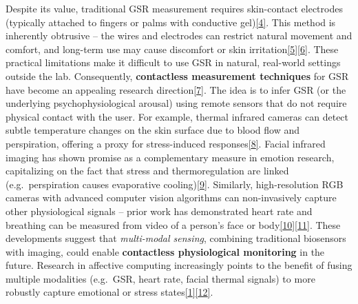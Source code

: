 \documentclass[12pt,a4paper]{article}
\begin{document}
Despite its value, traditional GSR measurement requires skin-contact electrodes (typically attached to fingers or palms with conductive gel)\href{docs/thesis_report/draft/Chapter_1__Introduction.md\#L10-L18}{{[}4{]}}. This method is inherently obtrusive -- the wires and electrodes can restrict natural movement and comfort, and long-term use may cause discomfort or skin irritation\href{docs/thesis_report/draft/Chapter_1__Introduction.md\#L14-L22}{{[}5{]}}\href{docs/thesis_report/draft/Chapter_1__Introduction.md\#L18-L26}{{[}6{]}}. These practical limitations make it difficult to use GSR in natural, real-world settings outside the lab. Consequently, \textbf{contactless measurement techniques} for GSR have become an appealing research direction\href{docs/thesis_report/draft/Chapter_1__Introduction.md\#L24-L31}{{[}7{]}}. The idea is to infer GSR (or the underlying psychophysiological arousal) using remote sensors that do not require physical contact with the user. For example, thermal infrared cameras can detect subtle temperature changes on the skin surface due to blood flow and perspiration, offering a proxy for stress-induced responses\href{https://pmc.ncbi.nlm.nih.gov/articles/PMC8187483/\#:~:text=measures\%20targeting\%20a\%20variety\%20of,in\%20affective\%20research7\%20\%E2\%80\%93\%2032}{{[}8{]}}. Facial infrared imaging has shown promise as a complementary measure in emotion research, capitalizing on the fact that stress and thermoregulation are linked (e.g.~perspiration causes evaporative cooling)\href{https://pmc.ncbi.nlm.nih.gov/articles/PMC8187483/\#:~:text=compliments\%20the\%20traditional\%20measures\%20is,results\%20in\%20affective\%20research\%2031\%E2\%80\%939}{{[}9{]}}. Similarly, high-resolution RGB cameras with advanced computer vision algorithms can non-invasively capture other physiological signals -- prior work has demonstrated heart rate and breathing can be measured from video of a person's face or body\href{docs/thesis_report/draft/bibliography.md\#L41-L45}{{[}10{]}}\href{docs/thesis_report/draft/bibliography.md\#L13-L17}{{[}11{]}}. These developments suggest that \emph{multi-modal sensing}, combining traditional biosensors with imaging, could enable \textbf{contactless physiological monitoring} in the future. Research in affective computing increasingly points to the benefit of fusing multiple modalities (e.g.~GSR, heart rate, facial thermal signals) to more robustly capture emotional or stress states\href{https://pmc.ncbi.nlm.nih.gov/articles/PMC8187483/\#:~:text=Galvanic\%20skin\%20response\%20,conditions\%20which\%20recent\%20studies\%20have}{{[}1{]}}\href{https://pmc.ncbi.nlm.nih.gov/articles/PMC8187483/\#:~:text=compliments\%20the\%20traditional\%20measures\%20is,results\%20in\%20affective\%20research\%2031\%E2\%80\%939}{{[}12{]}}.
\end{document}
